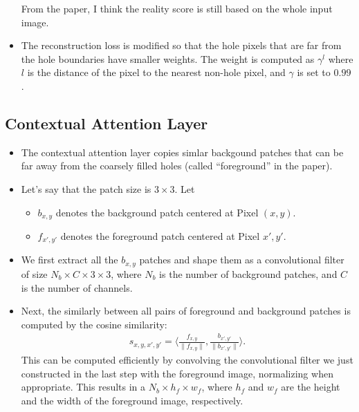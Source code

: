 \documentclass[10pt]{article}
\begin{document}
\begin{itemize}
    From the paper, I think the reality score is still based on the whole input image.

    \item The reconstruction loss is modified so that the hole pixels that are far from the hole boundaries have smaller weights. The weight is computed as $\gamma^l$ where $l$ is the distance of the pixel to the nearest non-hole pixel, and $\gamma$ is set to $0.99$.
  \end{itemize}

  \subsection{Contextual Attention Layer}

  \begin{itemize}
    \item The contextual attention layer copies simlar backgound patches that can be far away from the coarsely filled holes (called ``foreground'' in the paper).

    \item Let's say that the patch size is $3 \times 3$. Let
    \begin{itemize}
      \item $b_{x,y}$ denotes the background patch centered at Pixel $(x,y)$.
      \item $f_{x',y'}$ denotes the foreground patch centered at Pixel ${x', y'}$.
    \end{itemize}

    \item We first extract all the $b_{x,y}$ patches and shape them as a convolutional filter of size $N_b \times C \times 3 \times 3$, where $N_b$ is the number of background patches, and $C$ is the number of channels.

    \item Next, the similarly between all pairs of foreground and background patches is computed by the cosine similarity:
    \begin{align*}
      s_{x,y,x',y'} = \bigg\langle \frac{f_{x,y}}{\| f_{x,y} \|}, \frac{ b_{x',y'}}{\| b_{x',y'} \|} \bigg\rangle.
    \end{align*}
    This can be computed efficiently by convolving the convolutional filter we just constructed in the last step with the foreground image, normalizing when appropriate. This results in a $N_b \times h_f \times w_f$, where $h_f$ and $w_f$ are the height and the width of the foreground image, respectively.


\end{itemize}
\end{document}
